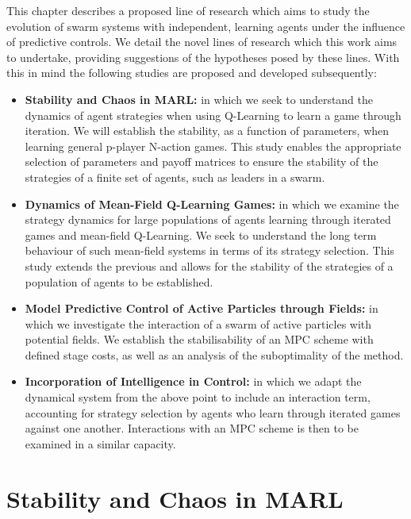 \documentclass[.../main.tex]{subfiles}
\begin{document}
	This chapter describes a proposed line of research which aims to study the evolution of swarm
	systems with independent, learning agents under the influence of predictive controls. We detail
	the novel lines of research which this work aims to undertake, providing suggestions of the
	hypotheses posed by these lines. With this in mind the following studies are proposed and
	developed subsequently:

	\begin{itemize}
		\item \textbf{Stability and Chaos in MARL:} in which we seek to understand the dynamics of
		agent strategies when using Q-Learning to learn a game through iteration. We will establish
		the stability, as a function of parameters, when learning general p-player N-action games.
		This study enables the appropriate selection of parameters and payoff matrices to ensure the
		stability of the strategies of a finite set of agents, such as leaders in a swarm.
		\item \textbf{Dynamics of Mean-Field Q-Learning Games:} in which we examine the
		strategy dynamics for large populations of agents learning through iterated games and
		mean-field Q-Learning. We seek to understand the long term behaviour of such mean-field
		systems in terms of its strategy selection. This study extends the previous and allows for
		the stability of the strategies of a population of agents to be established.
		\item \textbf{Model Predictive Control of Active Particles through Fields:} in which we
		investigate the interaction of a swarm of active particles with potential fields. We
		establish the stabilisability of an MPC scheme with defined stage costs, as well as an
		analysis of the suboptimality of the method.
		\item \textbf{Incorporation of Intelligence in Control:} in which we adapt the dynamical
		system from the above point to include an interaction term, accounting for strategy
		selection by agents who learn through iterated games against one another. Interactions with
		an MPC scheme is then to be examined in a similar capacity.

	\end{itemize}



    \section{Stability and Chaos in MARL} \label{sec::Chaos_in_MARL}
\end{document}
